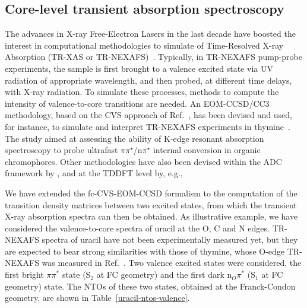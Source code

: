 \documentclass[journal=jctcce,manuscript=article]{achemso}
\begin{document}
\subsection{Core-level transient absorption spectroscopy}

The advances in X-ray Free-Electron Lasers in the last decade
have boosted the interest in computational methodologies to simulate of Time-Resolved X-ray Absorption (TR-XAS or TR-NEXAFS)~\cite{Milne2014,TransientXAS_H2O,acac_ultrafast_ISC,naturecomm}. Typically, in TR-NEXAFS pump-probe experiments, the sample is first brought to a valence excited state via UV radiation of appropriate wavelength, and then probed, at different time delays, with X-ray radiation. 
To simulate these processes, methods to compute the intensity of valence-to-core transitions  are needed.
An EOM-CCSD/CC3 methodology, based on the CVS approach of Ref.~, has been devised and used, for 
instance, to simulate and interpret TR-NEXAFS experiments in thymine~\cite{naturecomm}. The study aimed at assessing 
the ability of K-edge resonant absorption spectroscopy 
to probe ultrafast $\pi\pi^\star$/n$\pi^\star$ internal 
conversion in organic chromophores.
Other methodologies have also been devised within the ADC framework
by \citeauthor{Neville_ADC_TRNEXAFS}
\cite{Neville_ADC_TRNEXAFS,Neville_TRXAS,Neville_TRXAS_at_CI}, and at the TDDFT level by, e.g.,~\citeauthor{acac_ultrafast_ISC}\cite{acac_ultrafast_ISC}

We have extended the fc-CVS-EOM-CCSD formalism to the computation of  the transition density matrices between two excited states,
from which the transient X-ray absorption spectra can then be obtained.
As illustrative example, we have considered the valence-to-core spectra of uracil at the O, C and N edges. TR-NEXAFS spectra of uracil have not been experimentally measured yet, but they are expected to bear strong similarities with those of thymine, whose O-edge TR-NEXAFS was measured in Ref.~.
Two valence excited states were considered, the first 
bright $\pi\pi^{\ast}$ state (S$_2$ at FC geometry) and the first dark n$_O\pi^{\ast}$ (S$_1$ at FC  geometry) state. The NTOs of these two states,
obtained at the Franck-Condon geometry, are shown in 
Table~\ref{uracil-ntos-valence}.
\end{document}
